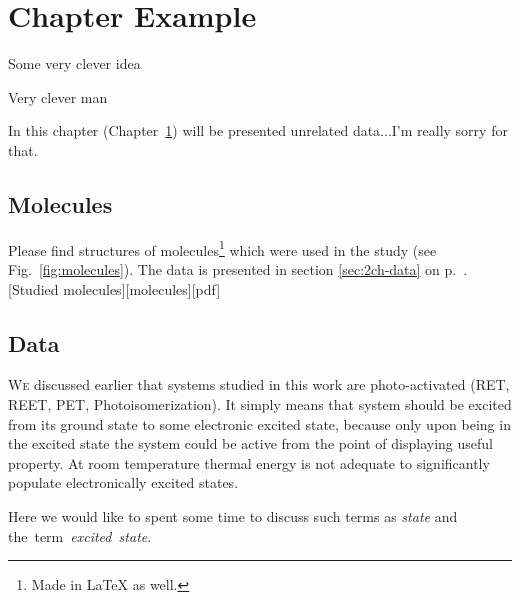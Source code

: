 \chapter{Chapter Example}
\label{ch:2chapter}
\epigraph{Some very clever idea }{Very clever man }
\startcontents[chapter]
\newpage

In this chapter (Chapter~\ref{ch:2chapter}) will be presented unrelated data...I'm really sorry for that.

\section{Molecules}
\label{sec:2ch-molecules}

Please find structures of molecules\footnote{Made in LaTeX as well.} which were used in the study (see Fig.~\ref{fig:molecules}). The data is presented in section \ref{sec:2ch-data} on p.~\pageref{sec:2ch-data}. 
[Studied molecules][molecules][pdf]


\section{Data}
\lettrine[lraise=0.1]{W}{e} discussed earlier that systems studied in this work are photo-activated (\acrshort{RET}, \acrshort{REET}, \acrshort{PET}, Photoisomerization). It simply means that system should be excited from its ground state to some electronic excited state, because only upon being in the excited state the system could be active from the point of displaying useful property. At room temperature thermal energy is not adequate to significantly populate electronically excited states.\par

Here we would like to spent some time to discuss such terms as \emph{state} and the~term~\emph{excited~state}.\par

